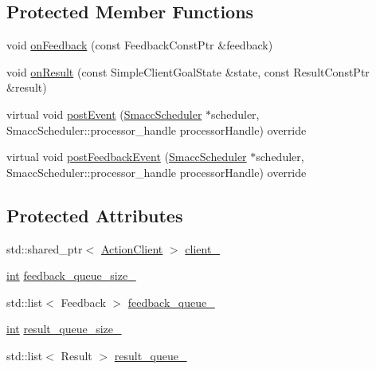 \subsection*{Protected Member Functions}
\begin{DoxyCompactItemize}
\item 
void \hyperlink{classsmacc_1_1SmaccActionClientBase_a9ba39f09edcf9a4737d8cb0f0d6ee5e2}{on\+Feedback} (const Feedback\+Const\+Ptr \&feedback)
\item 
void \hyperlink{classsmacc_1_1SmaccActionClientBase_a2866bc7b08d9b07d7d1faf4f42a93a46}{on\+Result} (const Simple\+Client\+Goal\+State \&state, const Result\+Const\+Ptr \&result)
\item 
virtual void \hyperlink{classsmacc_1_1SmaccActionClientBase_a2e2d131731d54ea529f6ff2ebb0c63cd}{post\+Event} (\hyperlink{common_8h_a13d01c0cecec33c3093445edab0a7eb4}{Smacc\+Scheduler} $\ast$scheduler, Smacc\+Scheduler\+::processor\+\_\+handle processor\+Handle) override
\item 
virtual void \hyperlink{classsmacc_1_1SmaccActionClientBase_a8e500f37853599d32c39483d442ede72}{post\+Feedback\+Event} (\hyperlink{common_8h_a13d01c0cecec33c3093445edab0a7eb4}{Smacc\+Scheduler} $\ast$scheduler, Smacc\+Scheduler\+::processor\+\_\+handle processor\+Handle) override
\end{DoxyCompactItemize}
\subsection*{Protected Attributes}
\begin{DoxyCompactItemize}
\item 
std\+::shared\+\_\+ptr$<$ \hyperlink{classsmacc_1_1SmaccActionClientBase_aea1392d9e41f48bda1de8acaec1c3233}{Action\+Client} $>$ \hyperlink{classsmacc_1_1SmaccActionClientBase_a10d3b707b855c6d360aeeb35e50cd0c7}{client\+\_\+}
\item 
\hyperlink{classint}{int} \hyperlink{classsmacc_1_1SmaccActionClientBase_a834575fe2be93d0ccada8c1d486c49cd}{feedback\+\_\+queue\+\_\+size\+\_\+}
\item 
std\+::list$<$ Feedback $>$ \hyperlink{classsmacc_1_1SmaccActionClientBase_a66fe8948b906b832b06b5dae469d8dc4}{feedback\+\_\+queue\+\_\+}
\item 
\hyperlink{classint}{int} \hyperlink{classsmacc_1_1SmaccActionClientBase_af3a3ef9ababeaf43ed283234657c936a}{result\+\_\+queue\+\_\+size\+\_\+}
\item 
std\+::list$<$ Result $>$ \hyperlink{classsmacc_1_1SmaccActionClientBase_a42c2e070235e6eeaca970c2abaeabec4}{result\+\_\+queue\+\_\+}
\end{DoxyCompactItemize}
